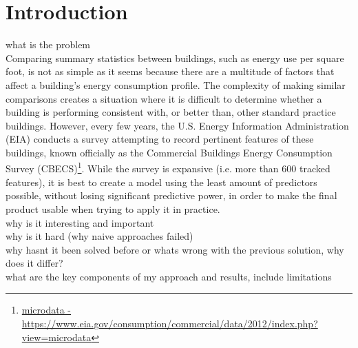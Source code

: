 {\section*{Introduction}}
\noindent
what is the problem\\
Comparing summary statistics between buildings, such as energy use per square foot, is not as simple as it seems because there are a multitude of factors that affect a building’s energy consumption profile.  The complexity of making similar comparisons creates a situation where it is difficult to determine whether a building is performing consistent with, or better than, other standard practice buildings.  However, every few years, the U.S. Energy Information Administration (EIA) conducts a survey attempting to record pertinent features of these buildings, known officially as the Commercial Buildings Energy Consumption Survey (CBECS)\footnote{\href{https://www.eia.gov/consumption/commercial/data/2012/index.php?view=microdata}{microdata - \url{https://www.eia.gov/consumption/commercial/data/2012/index.php?view=microdata}}}.  While the survey is expansive (i.e. more than 600 tracked features), it is best to create a model using the least amount of predictors possible, without losing significant predictive power, in order to make the final product usable when trying to apply it in practice.\\
why is it interesting and important\\
why is it hard (why naive approaches failed)\\
why hasnt it been solved before or whats wrong with the previous solution, why does it differ?\\
what are the key components of my approach and results, include limitations\\